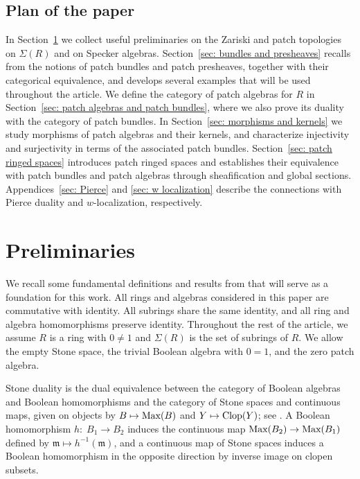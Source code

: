 \documentclass[11pt]{amsart}
\begin{document}
\subsection*{Plan of the paper}
In Section~\ref{sec: preliminaries} we collect useful preliminaries on the Zariski and patch topologies on $\Sigma(R)$ and on Specker algebras. Section~\ref{sec: bundles and presheaves} recalls from \cite{CosOlb} the notions of patch bundles and patch presheaves, together with their categorical equivalence, and develops several examples that will be used throughout the article. We define the category of patch algebras for $R$ in
Section~\ref{sec: patch algebras and patch bundles}, where we also prove its duality with the category of patch bundles. In Section~\ref{sec: morphisms and kernels} we study morphisms of patch algebras and their kernels, and characterize injectivity and surjectivity in terms of the associated patch bundles. Section~\ref{sec: patch ringed spaces} introduces patch ringed spaces and establishes
their equivalence with patch bundles and patch algebras through sheafification and global sections. Appendices~\ref{sec: Pierce} and \ref{sec: w localization} describe the connections with Pierce
duality and $w$-localization, respectively.


\section[Preliminaries]{Preliminaries}\label{sec: preliminaries}
We recall some fundamental definitions and results from \cite{CosOlb} that will serve as a foundation for this work. All rings and algebras considered in this paper are commutative with identity. All subrings share the same identity, and all ring and algebra homomorphisms preserve identity. 
Throughout the rest of the article, we assume $R$ is a ring with $0 \ne 1$ and $\Sigma(R)$ is the set of subrings of $R$. 
 We allow the empty Stone space, the trivial Boolean algebra with $0=1$, and the zero patch algebra.

Stone duality is the dual equivalence between the category of Boolean algebras and Boolean homomorphisms and the category of Stone spaces and continuous maps, given on objects by $B\mapsto\mbox{\rm Max}(B)$ and $Y\mapsto\mbox{\rm Clop}(Y)$; see \cite[Corollary~II.4.4, p.~71]{Joh86}. A Boolean homomorphism $h\colon\; B_1\to B_2$ induces the continuous map $\mbox{\rm Max}(B_2)\to\mbox{\rm Max}(B_1)$ defined by $\mathfrak m\mapsto h^{-1}(\mathfrak m)$, and a continuous map of Stone spaces induces a Boolean homomorphism in the opposite direction by inverse image on clopen subsets. 
\end{document}
